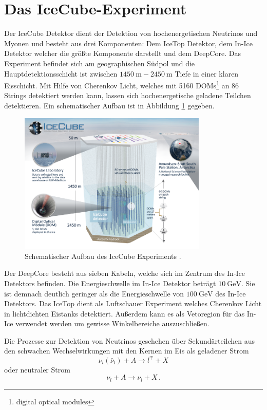 \section{Das IceCube-Experiment}
\label{sec:detector}
Der IceCube Detektor dient der Detektion von hochenergetischen 
Neutrinos und Myonen und besteht aus drei Komponenten: 
Dem IceTop Detektor, dem In-Ice Detektor welcher die gr\"o\ss te Komponente 
darstellt 
und dem DeepCore.
Das Experiment befindet sich am geographischen S\"udpol und die 
Hauptdetektionsschicht ist zwischen $\SI{1450}{\meter} - \SI{2450}{\meter}$ Tiefe
in einer klaren Eisschicht.
Mit Hilfe von Cherenkov Licht, welches mit 
5160 DOMs\footnote{digital optical modules} an 86 Strings detektiert werden kann, 
lassen sich hochenergetische geladene Teilchen detektieren.
Ein schematischer Aufbau ist in Abbildung \ref{fig:cube} gegeben.

\begin{figure}
  \centering
  \includegraphics[width=0.8\textwidth]{plots/icecube_detector_sm.png}
  \caption{Schematischer Aufbau des IceCube Experiments \cite{IceCubeImage}.}
  \label{fig:cube}
\end{figure}

Der DeepCore besteht aus sieben Kabeln, 
welche sich im Zentrum des In-Ice Detektors befinden. 
Die Energieschwelle im In-Ice Detektor beträgt $\SI{10}{\giga\electronvolt}$.
Sie ist demnach deutlich geringer als die 
Energieschwelle von $\SI{100}{\giga\electronvolt}$ des In-Ice Detektors.
Das IceTop dient als Luftschauer 
Experiment welches Cherenkov Licht in lichtdichten Eistanks detektiert. 
Au\ss erdem kann es als Vetoregion f\"ur das In-Ice verwendet werden 
um gewisse Winkelbereiche auszuschlie\ss en.

Die Prozesse zur Detektion von Neutrinos geschehen 
\"uber Sekund\"arteilchen aus den schwachen Wechselwirkungen 
mit den Kernen im Eis als geladener Strom
\begin{equation*}
  \nu_l (\bar{\nu}_l) + A \to l^{\mp} + X
\end{equation*}
oder neutraler Strom
\begin{equation*}
  \nu_l + A \to \nu_l + X\,.
\end{equation*}

